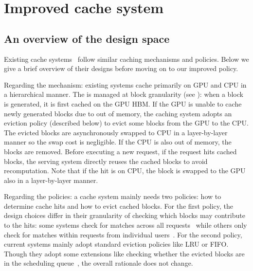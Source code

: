\section{Improved {\kvcache} cache system}
\label{sec:design}

\subsection{An overview of the design space}
\label{sec:design-mechanism}

\noindent
Existing {\kvcache} cache systems~\cite{cachedattention, vllm,sglang,DBLP:journals/corr/abs-2403-14401}
follow similar caching mechanisms and policies.
Below we give a brief overview of their designs
before moving on to our improved policy. 


Regarding the mechanism:
existing systems cache {\kvcache}
primarily on GPU and CPU in a hierarchical manner.
The {\kvcache} is managed at block granularity (see \textsection{\ref{sec:bg}}):
when a {\kvcache} block is generated,
it is first cached on the GPU HBM.
If the GPU is unable to cache newly generated blocks due to out of memory,
the caching system adopts an eviction policy (described below)
to evict some blocks from the GPU to the CPU.
The evicted blocks are asynchronously swapped to CPU in a layer-by-layer manner
so the swap cost is negligible.
If the CPU is also out of memory,
the blocks are removed.
Before executing a new request,
if the request hits cached blocks,
the serving system directly reuses the cached blocks to avoid recomputation.
Note that if the hit is on CPU, the block is swapped to the GPU also in a layer-by-layer manner.

Regarding the policies: a {\kvcache} cache system mainly needs two policies:
how to determine cache hits and how to evict cached blocks.
For the first policy,
the design choices differ in their granularity of checking which blocks may contribute to the hits:
some systems check for matches across all requests~\cite{sglang,DBLP:journals/corr/abs-2404-12457}
while others only check for matches within requests from individual users~\cite{DBLP:journals/corr/abs-2403-14401, cachedattention}.
For the second policy,
current systems mainly adopt standard eviction policies like LRU or FIFO.
Though they adopt some extensions
like checking whether the evicted blocks are in the scheduling queue~\cite{cachedattention},
the overall rationale does not change.

